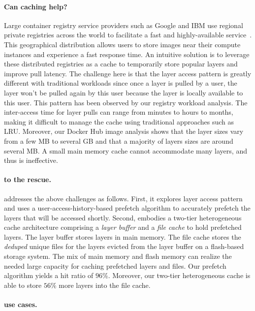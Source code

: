 \paragraph{Can caching help?}
Large container registry service providers such as Google and IBM use regional private registries across the world to facilitate a fast and highly-available service~\cite{ibmregistry,GoogleContainerRegistry}.  
This geographical distribution allows users to store images near their compute instances and experience a fast response time. 
An intuitive solution is to 
leverage these distributed registries as a cache to temporarily store popular layers and
improve pull latency.
The challenge here is that the layer access pattern is greatly different with traditional workloads 
since once a layer is pulled by a user, the layer won't be pulled again by this user because
the layer is locally available to this user. 
This pattern has been observed by our registry workload analysis. 
The inter-access time for layer pulls can range from minutes to hours to months, making it difficult to manage the cache using traditional approaches such as LRU.
Moreover, our Docker Hub image analysis shows that the layer sizes 
vary from a few MB to several GB and that a majority of layers sizes are around several MB. A small main memory cache cannot accommodate many layers, and thus is ineffective. 

\paragraph{\sysname to the rescue.}
\sysname addresses the above challenges as follows. 
First, it explores layer access pattern and uses a 
user-access-history-based prefetch algorithm to accurately prefetch
the layers that will be accessed shortly.
%
Second, \sysname embodies a two-tier heterogeneous cache architecture 
comprising a {\em layer buffer} and a {\em file cache} to hold  prefetched layers.
The layer buffer stores layers in main memory. The file cache stores 
the \emph{deduped} unique files for the layers evicted from the layer buffer on a 
flash-based storage system.
The mix of main memory and flash memory can realize the needed large capacity for caching prefetched layers and files. 
Our prefetch algorithm yields a hit ratio of $96$\%. 
Moreover, our two-tier heterogeneous cache is able to store $56$\% more layers into the file cache.

\paragraph{\sysname use cases.}

